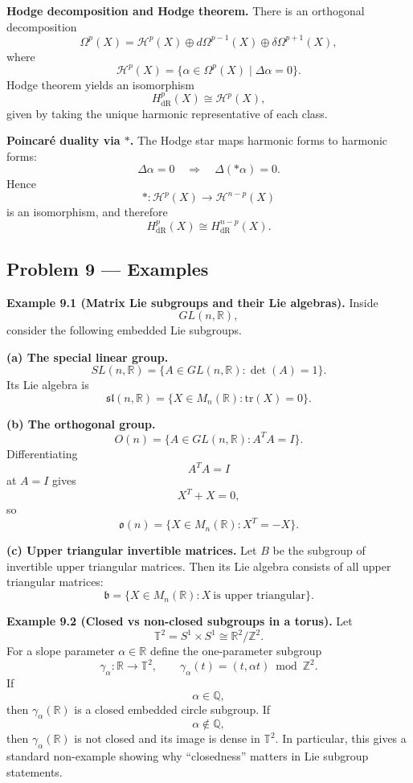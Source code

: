 \documentclass[12pt,a4paper]{article}
\theoremstyle{plain}
\theoremstyle{definition}      %
\begin{document}
\textbf{Hodge decomposition and Hodge theorem.}
There is an orthogonal decomposition
\[
\Omega^p(X)=\mathcal{H}^p(X)\oplus d\Omega^{p-1}(X)\oplus \delta\Omega^{p+1}(X),
\]
where
\[
\mathcal{H}^p(X)=\{\alpha\in\Omega^p(X)\mid \Delta\alpha=0\}.
\]
Hodge theorem yields an isomorphism
\[
H^p_{\mathrm{dR}}(X)\cong \mathcal{H}^p(X),
\]
given by taking the unique harmonic representative of each class.

\textbf{Poincar\'e duality via $*$.}
The Hodge star maps harmonic forms to harmonic forms:
\[
\Delta\alpha=0
\quad\Longrightarrow\quad
\Delta(*\alpha)=0.
\]
Hence
\[
*:\mathcal{H}^p(X)\to\mathcal{H}^{n-p}(X)
\]
is an isomorphism, and therefore
\[
H^p_{\mathrm{dR}}(X)\cong H^{n-p}_{\mathrm{dR}}(X).
\]

\subsection*{Problem 9 — Examples}

\textbf{Example 9.1 (Matrix Lie subgroups and their Lie algebras).}
Inside
\[
GL(n,\mathbb{R}),
\]
consider the following embedded Lie subgroups.

\medskip
\textbf{(a) The special linear group.}
\[
SL(n,\mathbb{R})=\{A\in GL(n,\mathbb{R}):\det(A)=1\}.
\]
Its Lie algebra is
\[
\mathfrak{sl}(n,\mathbb{R})=\{X\in M_{n}(\mathbb{R}):\mathrm{tr}(X)=0\}.
\]

\medskip
\textbf{(b) The orthogonal group.}
\[
O(n)=\{A\in GL(n,\mathbb{R}):A^{T}A=I\}.
\]
Differentiating
\[
A^{T}A=I
\]
at $A=I$ gives
\[
X^{T}+X=0,
\]
so
\[
\mathfrak{o}(n)=\{X\in M_{n}(\mathbb{R}):X^{T}=-X\}.
\]

\medskip
\textbf{(c) Upper triangular invertible matrices.}
Let $B$ be the subgroup of invertible upper triangular matrices.
Then its Lie algebra consists of all upper triangular matrices:
\[
\mathfrak{b}=\{X\in M_{n}(\mathbb{R}):X\ \text{is upper triangular}\}.
\]

\medskip
\textbf{Example 9.2 (Closed vs non-closed subgroups in a torus).}
Let
\[
\mathbb{T}^{2}=S^{1}\times S^{1}\cong \mathbb{R}^{2}/\mathbb{Z}^{2}.
\]
For a slope parameter $\alpha\in\mathbb{R}$ define the one-parameter subgroup
\[
\gamma_{\alpha}:\mathbb{R}\to\mathbb{T}^{2},
\qquad
\gamma_{\alpha}(t)=(t,\alpha t)\bmod \mathbb{Z}^{2}.
\]
If
\[
\alpha\in\mathbb{Q},
\]
then $\gamma_{\alpha}(\mathbb{R})$ is a closed embedded circle subgroup.
If
\[
\alpha\notin\mathbb{Q},
\]
then $\gamma_{\alpha}(\mathbb{R})$ is not closed and its image is dense in $\mathbb{T}^{2}$.
In particular, this gives a standard non-example showing why “closedness” matters in Lie subgroup statements.
\end{document}
